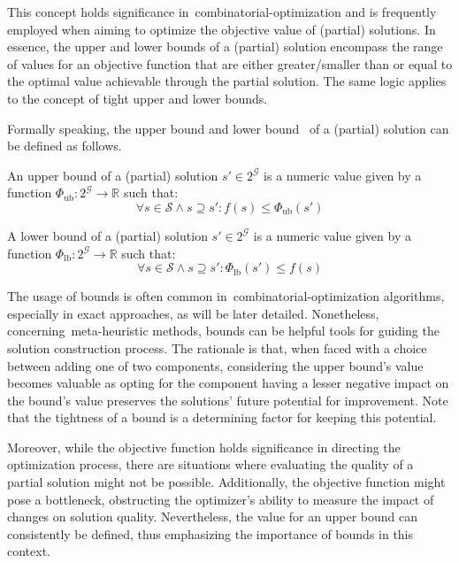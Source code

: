 This concept holds significance in~\acrshort{combinatorial-optimization} and is
frequently employed when aiming to optimize the objective value of (partial)
solutions. In essence, the upper and lower bounds of a (partial) solution
encompass the range of values for an objective function that are either
greater/smaller than or equal to the optimal value achievable through the
partial solution. The same logic applies to the concept of tight upper and lower
bounds.

Formally speaking, the upper bound and lower
bound~\cite{papadimitriou1998combinatorial,outeiro2021application} of a
(partial) solution can be defined as follows.

\begin{definition}
  \label{def:upper-bound}
  An upper bound of a (partial) solution $s' \in 2^\mathcal{G}$ is a numeric
  value given by a function $\Phi_\text{ub}\colon 2^{\mathcal{G}} \rightarrow
    \mathbb{R} $ such that:
  \begin{equation}
    \forall s \in \mathcal{S} \land s \supseteq s' \colon f(s) \le \Phi_\text{ub}(s')
  \end{equation}
\end{definition}

\begin{definition}
  \label{def:lower-bound}
  A lower bound of a (partial) solution $s' \in 2^\mathcal{G}$ is a numeric
  value given by a function $\Phi_\text{lb}\colon 2^{\mathcal{G}} \rightarrow
    \mathbb{R}$ such that:
  \begin{equation}
    \forall s \in \mathcal{S} \land s \supseteq s'\colon \Phi_\text{lb}(s') \le f(s)
  \end{equation}
\end{definition}

The usage of bounds is often common in~\acrshort{combinatorial-optimization}
algorithms, especially in exact approaches, as will be later detailed.
Nonetheless, concerning~\acrshort{meta-heuristic} methods, bounds can be helpful
tools for guiding the solution construction process. The rationale is that, when
faced with a choice between adding one of two components, considering the upper
bound's value becomes valuable as opting for the component having a lesser
negative impact on the bound's value preserves the solutions' future potential
for improvement. Note that the tightness of a bound is a determining factor for
keeping this potential.

Moreover, while the objective function holds significance in directing the
optimization process, there are situations where evaluating the quality of a
partial solution might not be possible. Additionally, the objective function
might pose a bottleneck, obstructing the optimizer's ability to measure the
impact of changes on solution quality. Nevertheless, the value for an upper
bound can consistently be defined, thus emphasizing the importance of
bounds in this context.

